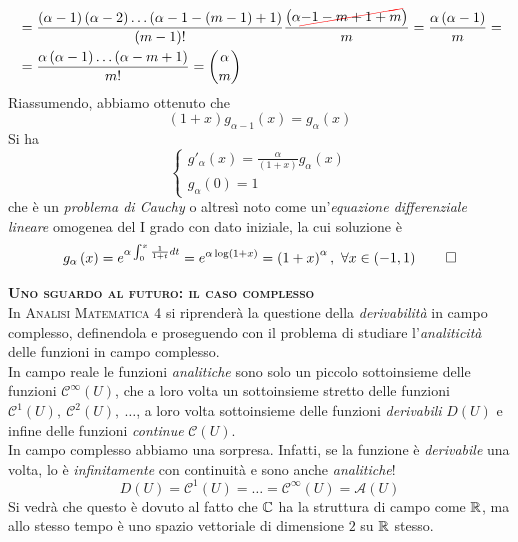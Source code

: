 \begin{demonstration}
\begin{itemize}
\begin{align*}
		&=\frac{\left(\alpha-1\right)\left(\alpha-2\right)\ldots\left(\alpha-1-\left(m-1\right)+1\right)}{\left(m-1\right)!}\frac{\left(\alpha\Ccancel[red]{-1-m+1+m}\right)}{m}=\frac{\alpha\left(\alpha-1\right)}{m}=\\
		&=\frac{\alpha\left(\alpha-1\right)\ldots\left(\alpha-m+1\right)}{m!}=\binom{\alpha}{m}
	\end{align*}
Riassumendo, abbiamo ottenuto che
\begin{equation*}
	\left(1+x\right)g_{\alpha-1}\left(x\right)=g_\alpha\left(x\right)
\end{equation*}
Si ha
\begin{equation*}
	\begin{cases}
		g'_{\alpha}\left(x\right)=\frac{\alpha}{\left(1+x\right)}g_{\alpha}\left(x\right)\\
		g_{\alpha}\left(0\right)=1
	\end{cases}
\end{equation*}
che è un \textit{problema di Cauchy} o altresì noto come un'\textit{equazione differenziale lineare} omogenea del I grado con dato iniziale, la cui soluzione è
\begin{equation*}
	g_{\alpha}\left(x\right)=e^{\alpha\int_{0}^{x}\frac{1}{1+t}dt}=e^{\alpha\log\left(1+x\right)}=\left(1+x\right)^{\alpha},\ \forall x\in\left(-1,1\right)\qedhere
\end{equation*}
\end{itemize}
\end{demonstration}%
\begin{digression}\textsc{\textbf{Uno sguardo al futuro: il caso complesso}}\\
	In \textsc{Analisi Matematica 4} si riprenderà la questione della \textit{derivabilità} in campo complesso, definendola e proseguendo con il problema di studiare l'\textit{analiticità} delle funzioni in campo complesso.\\
	In campo reale le funzioni \textit{analitiche} sono solo un piccolo sottoinsieme delle funzioni $\mathcal{C}^{\infty}\left(U\right)$, che a loro volta un sottoinsieme stretto delle funzioni $\mathcal{C}^1\left(U\right),\ \mathcal{C}^2\left(U\right),\ \ldots$, a loro volta sottoinsieme delle funzioni \textit{derivabili} $D\left(U\right)$ e infine delle funzioni \textit{continue} $\mathcal{C}\left(U\right)$.\\
	In campo complesso abbiamo una sorpresa. Infatti, se la funzione è \textit{derivabile} una volta, lo è \textit{infinitamente} con continuità e sono anche \textit{analitiche}!
	\begin{equation*}
		D\left(U\right)=\mathcal{C}^1\left(U\right)=\ldots=\mathcal{C}^{\infty}\left(U\right)=\mathcal{A}(U)
	\end{equation*}
	Si vedrà che questo è dovuto al fatto che $\mathbb{C}$ ha la struttura di campo come $\mathbb{R}$, ma allo stesso tempo è uno spazio vettoriale di dimensione $2$ su $\mathbb{R}$ stesso.
\end{digression}
